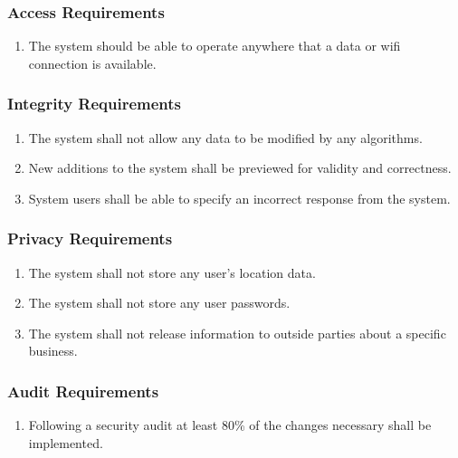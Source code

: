 \documentclass[titlepage]{article}
\newcounter{req}
\begin{document}
		\subsubsection{Access Requirements}
		\label{ssub:access_requirements}
		\begin{enumerate}[{SR}1. ]
		\setcounter{enumi}{\value{req}}
			\item
			The system should be able to operate anywhere that a data or wifi connection is available.
		\setcounter{req}{\theenumi}
		\end{enumerate}
		
		\subsubsection{Integrity Requirements}
		\label{ssub:integrity_requirements}
		\begin{enumerate}[{SR}1. ]
		\setcounter{enumi}{\value{req}}
			\item 
			The system shall not allow any data to be modified by any algorithms.
			\item
			New additions to the system shall be previewed for validity and correctness.
			\item
			System users shall be able to specify an incorrect response from the system.
		\setcounter{req}{\theenumi}
		\end{enumerate}
		
		\subsubsection{Privacy Requirements}
		\label{ssub:privacy_requirements}
		\begin{enumerate}[{SR}1. ]
		\setcounter{enumi}{\value{req}}
			\item 
			The system shall not store any user's location data.
			\item
			The system shall not store any user passwords.
			\item
			The system shall not release information to outside parties about a specific business.
		\setcounter{req}{\theenumi}
		\end{enumerate}
		
		\subsubsection{Audit Requirements}
		\label{ssub:audit_requirements}
		\begin{enumerate}[{SR}1. ]
		\setcounter{enumi}{\value{req}}
			\item 
			Following a security audit at least 80\% of the changes necessary shall be implemented.
		\setcounter{req}{\theenumi}
		\end{enumerate}
		
\end{document}
